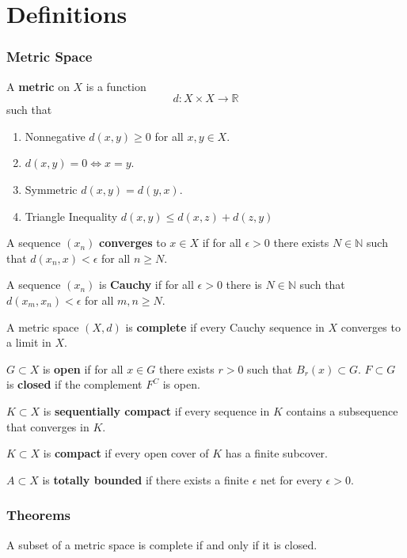 \documentclass[12pt]{article}
\begin{document}
\section{Definitions}

\subsubsection{Metric Space}
A \textbf{metric} on $X$ is a function
\[
    d: X \times X \rightarrow \mathbb{R}
\]
such that

\begin{enumerate}
    \item Nonnegative $d(x, y) \geq 0$ for all $x, y \in X$.

    \item $d(x, y) = 0 \iff x = y$.

    \item Symmetric $d(x, y) = d(y, x)$.

    \item Triangle Inequality $d(x, y) \leq d(x, z) + d(z, y)$
\end{enumerate}

A sequence $(x_n)$ \textbf{converges} to $x \in X$ if for all $\epsilon > 0$ there
exists $N \in \mathbb{N}$ such that $d(x_n, x) < \epsilon$ for all $n \geq
N$.

A sequence $(x_n)$ is \textbf{Cauchy} if for all $\epsilon > 0$ there is $N
\in \mathbb{N}$ such that $d(x_m, x_n) < \epsilon$ for all $m, n \geq N$.

A metric space $(X, d)$ is \textbf{complete} if every Cauchy sequence in $X$
converges to a limit in $X$.

$G \subset X$ is \textbf{open} if for all $x \in G$ there exists $r > 0$
such that $B_r (x) \subset G$. $F \subset G$ is \textbf{closed} if the complement
$F^C$ is open.

$K \subset X$ is \textbf{sequentially compact} if every sequence in $K$
contains a subsequence that converges in $K$.

$K \subset X$ is \textbf{compact} if every open cover of $K$ has a finite
subcover.

$A \subset X$ is \textbf{totally bounded} if there exists a finite
$\epsilon$ net for every $\epsilon > 0$.

\subsubsection{Theorems}

A subset of a metric space is complete if and only if it is closed.
\end{document}

